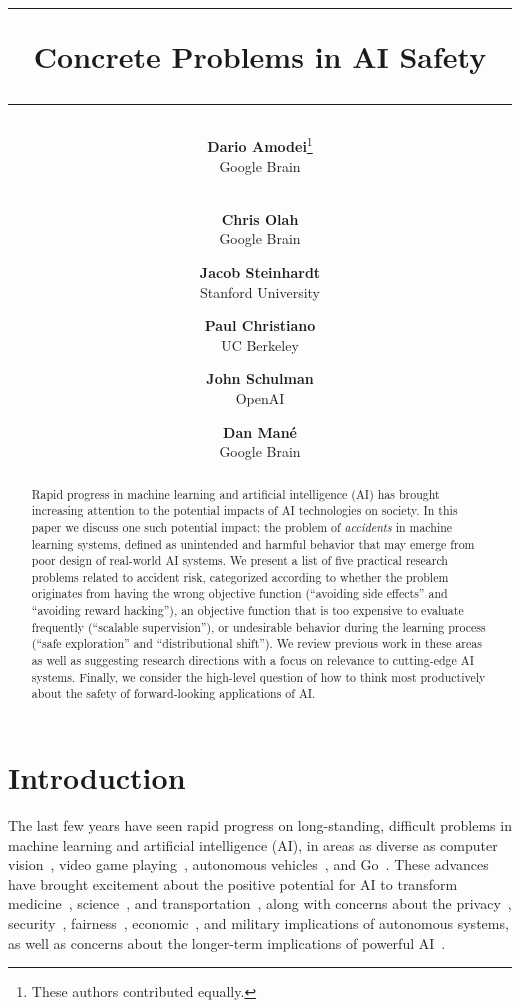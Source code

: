 \documentclass[a4paper,10pt]{article}
\date{}
\author{{\bf Dario Amodei}\thanks{These authors contributed equally.}\\
Google Brain\\
$~$\\
\and
{\bf Chris Olah}\samethanks\\
Google Brain\\
\and
{\bf Jacob Steinhardt}\\
Stanford University\\
\and
{\bf Paul Christiano}\\
UC Berkeley\\
\and
{\bf John Schulman}\\
OpenAI\\
\and
{\bf Dan Man\'e}\\
Google Brain\\
}
\date{}
\title{
\rule[0.4cm]{\textwidth}{2pt}
{\bf Concrete Problems in AI Safety}
\rule{\textwidth}{2pt} 
}
\begin{document}
\maketitle













\begin{abstract}
\noindent Rapid progress in machine learning and artificial intelligence (AI) has brought increasing attention to the potential impacts of AI technologies on society.  In this paper we discuss one such potential impact: the problem of \emph{accidents} in machine learning systems, defined as unintended and harmful behavior that may emerge from poor design of real-world AI systems.  We present a list of five practical research problems related to accident risk, categorized according to whether the problem originates from having the wrong objective function (``avoiding side effects'' and ``avoiding reward hacking''), an objective function that is too expensive to evaluate frequently (``scalable supervision''), or undesirable behavior during the learning process (``safe exploration'' and ``distributional shift'').  We review previous work in these areas as well as suggesting research directions with a focus on relevance to cutting-edge AI systems.  Finally, we consider the high-level question of how to think most productively about the safety of forward-looking applications of AI.
\end{abstract}

\section{Introduction} \label{introduction}

The last few years have seen rapid progress on long-standing, difficult problems in machine learning and artificial intelligence (AI), in areas as diverse as computer vision~\cite{krizhevsky2012imagenet}, video game playing~\cite{mnih2015human}, autonomous vehicles~\cite{levinson2011towards}, and Go~\cite{silver2016mastering}.  These advances have brought excitement about the positive potential for AI to transform medicine~\cite{ramsundar2015massively}, science~\cite{gil2014amplify}, and transportation~\cite{levinson2011towards}, along with concerns about the privacy~\cite{ji2014differential}, security~\cite{papernot2016practical}, fairness~\cite{adebayo2014hidden}, economic~\cite{brynjolfsson2014second}, and military \cite{OpenLetterWeapons} implications of autonomous systems, as well as concerns about the longer-term implications of powerful AI~\cite{bostrom2014superintelligence,yudkowsky2008artificial}.
\end{document}
